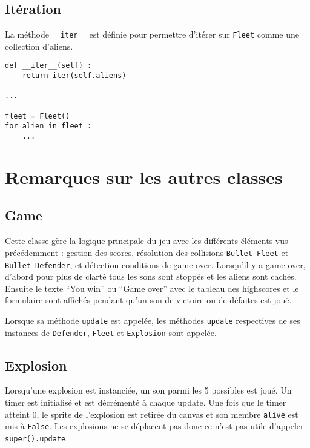 \documentclass[12pt]{article}
\begin{document}
	\subsection{Itération}
	La méthode \texttt{\_\_iter\_\_} est définie pour permettre d'itérer sur \texttt{Fleet} comme une collection d'aliens.

\begin{verbatim}
def __iter__(self) :
	return iter(self.aliens)

...

fleet = Fleet()
for alien in fleet :
	...
\end{verbatim}


\vfill

\section{Remarques sur les autres classes}
	


	\subsection{Game}

	Cette classe gère la logique principale du jeu avec les différents éléments vus précédemment : gestion des scores, résolution des collisions \texttt{Bullet-Fleet} et \texttt{Bullet-Defender}, et détection conditions de game over. Lorsqu'il y a game over, d'abord pour plus de clarté tous les sons sont stoppés et les aliens sont cachés. Ensuite le texte \enquote{You win} ou \enquote{Game over} avec le tableau des highscores et le formulaire sont affichés pendant qu'un son de victoire ou de défaites est joué.

	\par Lorsque sa méthode \texttt{update} est appelée, les méthodes \texttt{update} respectives de ses instances de \texttt{Defender}, \texttt{Fleet} et \texttt{Explosion} sont appelée.


	\subsection{Explosion}
	Lorsqu'une explosion est instanciée, un son parmi les 5 possibles est joué. Un timer est initialisé et est décrémenté à chaque update. Une fois que le timer atteint 0, le sprite de l'explosion est retirée du canvas et son membre \texttt{alive} est mis à \texttt{False}. Les explosions ne se déplacent pas donc ce n'est pas utile d'appeler \texttt{super().update}.
\end{document}
